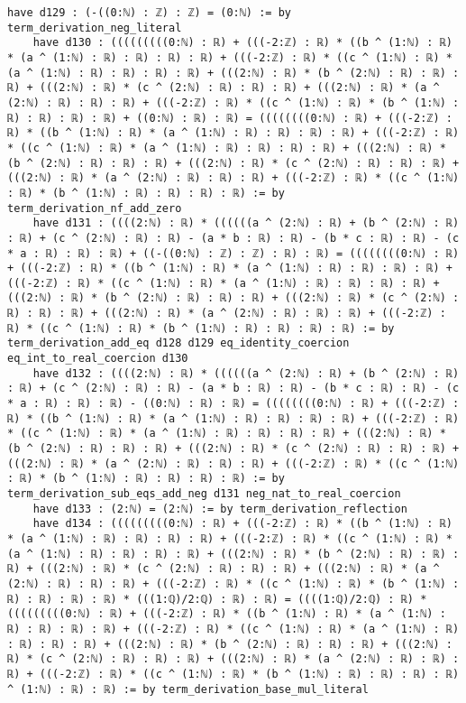 \documentclass{article}
\begin{document}
\begin{tcolorbox}[colback=white!10, width=\linewidth]
\begin{lstlisting}[language=Lean4]
    have d129 : (-((0:ℕ) : ℤ) : ℤ) = (0:ℕ) := by term_derivation_neg_literal
    have d130 : (((((((((0:ℕ) : ℝ) + (((-2:ℤ) : ℝ) * ((b ^ (1:ℕ) : ℝ) * (a ^ (1:ℕ) : ℝ) : ℝ) : ℝ) : ℝ) + (((-2:ℤ) : ℝ) * ((c ^ (1:ℕ) : ℝ) * (a ^ (1:ℕ) : ℝ) : ℝ) : ℝ) : ℝ) + (((2:ℕ) : ℝ) * (b ^ (2:ℕ) : ℝ) : ℝ) : ℝ) + (((2:ℕ) : ℝ) * (c ^ (2:ℕ) : ℝ) : ℝ) : ℝ) + (((2:ℕ) : ℝ) * (a ^ (2:ℕ) : ℝ) : ℝ) : ℝ) + (((-2:ℤ) : ℝ) * ((c ^ (1:ℕ) : ℝ) * (b ^ (1:ℕ) : ℝ) : ℝ) : ℝ) : ℝ) + ((0:ℕ) : ℝ) : ℝ) = ((((((((0:ℕ) : ℝ) + (((-2:ℤ) : ℝ) * ((b ^ (1:ℕ) : ℝ) * (a ^ (1:ℕ) : ℝ) : ℝ) : ℝ) : ℝ) + (((-2:ℤ) : ℝ) * ((c ^ (1:ℕ) : ℝ) * (a ^ (1:ℕ) : ℝ) : ℝ) : ℝ) : ℝ) + (((2:ℕ) : ℝ) * (b ^ (2:ℕ) : ℝ) : ℝ) : ℝ) + (((2:ℕ) : ℝ) * (c ^ (2:ℕ) : ℝ) : ℝ) : ℝ) + (((2:ℕ) : ℝ) * (a ^ (2:ℕ) : ℝ) : ℝ) : ℝ) + (((-2:ℤ) : ℝ) * ((c ^ (1:ℕ) : ℝ) * (b ^ (1:ℕ) : ℝ) : ℝ) : ℝ) : ℝ) := by term_derivation_nf_add_zero
    have d131 : ((((2:ℕ) : ℝ) * ((((((a ^ (2:ℕ) : ℝ) + (b ^ (2:ℕ) : ℝ) : ℝ) + (c ^ (2:ℕ) : ℝ) : ℝ) - (a * b : ℝ) : ℝ) - (b * c : ℝ) : ℝ) - (c * a : ℝ) : ℝ) : ℝ) + ((-((0:ℕ) : ℤ) : ℤ) : ℝ) : ℝ) = ((((((((0:ℕ) : ℝ) + (((-2:ℤ) : ℝ) * ((b ^ (1:ℕ) : ℝ) * (a ^ (1:ℕ) : ℝ) : ℝ) : ℝ) : ℝ) + (((-2:ℤ) : ℝ) * ((c ^ (1:ℕ) : ℝ) * (a ^ (1:ℕ) : ℝ) : ℝ) : ℝ) : ℝ) + (((2:ℕ) : ℝ) * (b ^ (2:ℕ) : ℝ) : ℝ) : ℝ) + (((2:ℕ) : ℝ) * (c ^ (2:ℕ) : ℝ) : ℝ) : ℝ) + (((2:ℕ) : ℝ) * (a ^ (2:ℕ) : ℝ) : ℝ) : ℝ) + (((-2:ℤ) : ℝ) * ((c ^ (1:ℕ) : ℝ) * (b ^ (1:ℕ) : ℝ) : ℝ) : ℝ) : ℝ) := by term_derivation_add_eq d128 d129 eq_identity_coercion eq_int_to_real_coercion d130
    have d132 : ((((2:ℕ) : ℝ) * ((((((a ^ (2:ℕ) : ℝ) + (b ^ (2:ℕ) : ℝ) : ℝ) + (c ^ (2:ℕ) : ℝ) : ℝ) - (a * b : ℝ) : ℝ) - (b * c : ℝ) : ℝ) - (c * a : ℝ) : ℝ) : ℝ) - ((0:ℕ) : ℝ) : ℝ) = ((((((((0:ℕ) : ℝ) + (((-2:ℤ) : ℝ) * ((b ^ (1:ℕ) : ℝ) * (a ^ (1:ℕ) : ℝ) : ℝ) : ℝ) : ℝ) + (((-2:ℤ) : ℝ) * ((c ^ (1:ℕ) : ℝ) * (a ^ (1:ℕ) : ℝ) : ℝ) : ℝ) : ℝ) + (((2:ℕ) : ℝ) * (b ^ (2:ℕ) : ℝ) : ℝ) : ℝ) + (((2:ℕ) : ℝ) * (c ^ (2:ℕ) : ℝ) : ℝ) : ℝ) + (((2:ℕ) : ℝ) * (a ^ (2:ℕ) : ℝ) : ℝ) : ℝ) + (((-2:ℤ) : ℝ) * ((c ^ (1:ℕ) : ℝ) * (b ^ (1:ℕ) : ℝ) : ℝ) : ℝ) : ℝ) := by term_derivation_sub_eqs_add_neg d131 neg_nat_to_real_coercion
    have d133 : (2:ℕ) = (2:ℕ) := by term_derivation_reflection
    have d134 : (((((((((0:ℕ) : ℝ) + (((-2:ℤ) : ℝ) * ((b ^ (1:ℕ) : ℝ) * (a ^ (1:ℕ) : ℝ) : ℝ) : ℝ) : ℝ) + (((-2:ℤ) : ℝ) * ((c ^ (1:ℕ) : ℝ) * (a ^ (1:ℕ) : ℝ) : ℝ) : ℝ) : ℝ) + (((2:ℕ) : ℝ) * (b ^ (2:ℕ) : ℝ) : ℝ) : ℝ) + (((2:ℕ) : ℝ) * (c ^ (2:ℕ) : ℝ) : ℝ) : ℝ) + (((2:ℕ) : ℝ) * (a ^ (2:ℕ) : ℝ) : ℝ) : ℝ) + (((-2:ℤ) : ℝ) * ((c ^ (1:ℕ) : ℝ) * (b ^ (1:ℕ) : ℝ) : ℝ) : ℝ) : ℝ) * (((1:ℚ)/2:ℚ) : ℝ) : ℝ) = ((((1:ℚ)/2:ℚ) : ℝ) * (((((((((0:ℕ) : ℝ) + (((-2:ℤ) : ℝ) * ((b ^ (1:ℕ) : ℝ) * (a ^ (1:ℕ) : ℝ) : ℝ) : ℝ) : ℝ) + (((-2:ℤ) : ℝ) * ((c ^ (1:ℕ) : ℝ) * (a ^ (1:ℕ) : ℝ) : ℝ) : ℝ) : ℝ) + (((2:ℕ) : ℝ) * (b ^ (2:ℕ) : ℝ) : ℝ) : ℝ) + (((2:ℕ) : ℝ) * (c ^ (2:ℕ) : ℝ) : ℝ) : ℝ) + (((2:ℕ) : ℝ) * (a ^ (2:ℕ) : ℝ) : ℝ) : ℝ) + (((-2:ℤ) : ℝ) * ((c ^ (1:ℕ) : ℝ) * (b ^ (1:ℕ) : ℝ) : ℝ) : ℝ) : ℝ) ^ (1:ℕ) : ℝ) : ℝ) := by term_derivation_base_mul_literal

\end{lstlisting}
\end{tcolorbox}
\end{document}
